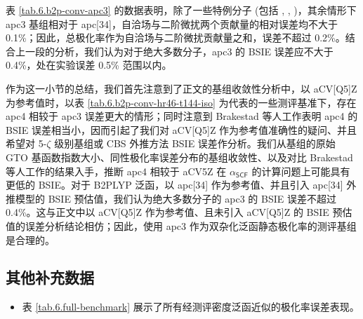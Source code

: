 表 \ref{tab.6.b2p-conv-apc3} 的数据表明，除了一些特例分子 (包括 , , )，其余情形下 apc3 基组相对于 apc[34]，自洽场与二阶微扰两个贡献量的相对误差均不大于 0.1\%；因此，总极化率作为自洽场与二阶微扰贡献量之和，误差不超过 0.2\%。结合上一段的分析，我们认为对于绝大多数分子，apc3 的 BSIE 误差应不大于 0.4\%，处在实验误差 0.5\% 范围以内。

作为这一小节的总结，我们首先注意到了正文的基组收敛性分析中，以 aCV[Q5]Z 为参考值时，以表 \ref{tab.6.b2p-conv-hr46-t144-iso} 为代表的一些测评基准下，存在 apc4 相较于 apc3 误差更大的情形；同时注意到 Brakestad 等人工作\cite{Brakestad-Frediani.JCTC.2020}表明 apc4 的 BSIE 误差相当小，因而引起了我们对 aCV[Q5]Z 作为参考值准确性的疑问、并且希望对 5-$\zeta$ 级别基组或 CBS 外推方法 BSIE 误差作分析。我们从基组的原始 GTO 基函数指数大小、同性极化率误差分布的基组收敛性、以及对比 Brakestad 等人工作\cite{Brakestad-Frediani.JCTC.2020}的结果入手，推断 apc4 相较于 aCV5Z 在 $\alpha_\textsf{SCF}$ 的计算问题上可能具有更低的 BSIE。对于 B2PLYP 泛函，以 apc[34] 作为参考值、并且引入 apc[34] 外推模型的 BSIE 预估值，我们认为绝大多数分子的 apc3 的 BSIE 误差不超过 0.4\%。这与正文中以 aCV[Q5]Z 作为参考值、且未引入 aCV[Q5]Z 的 BSIE 预估值的误差分析结论相仿；因此，使用 apc3 作为双杂化泛函静态极化率的测评基组是合理的。

\subsection{其他补充数据}

\begin{itemize}[nosep]
    \item 表 \ref{tab.6.full-benchmark} 展示了所有经测评密度泛函近似的极化率误差表现。
\end{itemize}

\newpage

\begingroup
\setlength{\LTleft}{-20cm plus -1fill}
\setlength{\LTright}{\LTleft}

